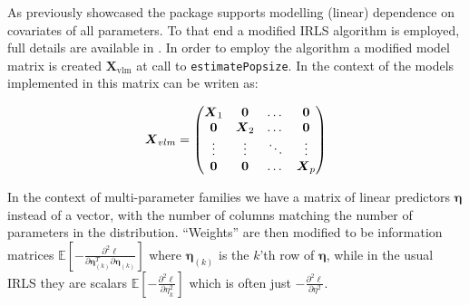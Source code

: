 \documentclass[
]{jss}
\newcommand{\1}{\mathcal{I}} \newcommand{\bx}{\boldsymbol{x}}
\begin{document}
As previously showcased the  package supports
modelling (linear) dependence on covariates of all parameters. To that
end a modified IRLS algorithm is employed, full details are available in
\cite{VGAM-main}. In order to employ the algorithm a modified model
matrix is created \(\boldsymbol{X}_{\text{vlm}}\) at call to
\texttt{estimatePopsize}. In the context of the models implemented in
 this matrix can be writen as:

\begin{equation}
  \boldsymbol{X}_{vlm}=
  \begin{pmatrix}
    \boldsymbol{X}_{1} & \boldsymbol{0} &\dotso &\boldsymbol{0}\cr
    \boldsymbol{0} & \boldsymbol{X}_{2} &\dotso &\boldsymbol{0}\cr
    \vdots & \vdots & \ddots & \vdots\cr
    \boldsymbol{0} & \boldsymbol{0} &\dotso &\boldsymbol{X}_{p}
  \end{pmatrix}
\end{equation}

In the context of multi-parameter families we have a matrix of linear
predictors \(\boldsymbol{\eta}\) instead of a vector, with the number of
columns matching the number of parameters in the distribution.
``Weights'' are then modified to be information matrices
\(\displaystyle\mathbb{E}\left[-\frac{\partial^{2}\ell}{\partial\boldsymbol{\eta}_{(k)}^{T}\partial\boldsymbol{\eta}_{(k)}}\right]\)
where \(\boldsymbol{\eta}_{(k)}\) is the \(k\)'th row of
\(\boldsymbol{\eta}\), while in the usual IRLS they are scalars
\(\displaystyle\mathbb{E}\left[-\frac{\partial^{2}\ell}{\partial\eta_{k}^{2}}\right]\)
which is often just
\(\displaystyle-\frac{\partial^{2}\ell}{\partial\eta^{2}}\).
\end{document}
